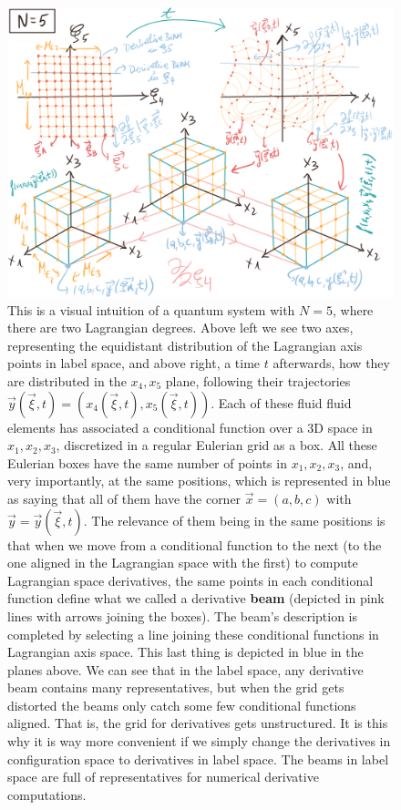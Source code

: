 \documentclass[11pt, a4paper]{article} %
\begin{document}
\begin{figure}[p!]
  \centering
    \includegraphics[width=1\linewidth]{12_N6.png}
  \caption{This is a visual intuition of a quantum system with $N=5$, where there are two Lagrangian degrees. Above left we see two axes, representing the equidistant distribution of the Lagrangian axis points in label space, and above right, a time $t$ afterwards, how they are distributed in the $x_4,x_5$ plane, following their trajectories $\vec{y}(\vec{\xi},t)=(x_4(\vec{\xi},t),x_5(\vec{\xi},t))$. Each of these fluid fluid elements has associated a conditional function over a 3D space in $x_1,x_2,x_3$, discretized in a regular Eulerian grid as a box. All these Eulerian boxes have the same number of points in $x_1,x_2,x_3$, and, very importantly, at the same positions, which is represented in blue as saying that all of them have the corner $\vec{x}=(a,b,c)$ with $\vec{y}=\vec{y}(\vec{\xi},t)$. The relevance of them being in the same positions is that when we move from a conditional function to the next (to the one aligned in the Lagrangian space with the first) to compute Lagrangian space derivatives, the same points in each conditional function define what we called a derivative {\bf beam} (depicted in pink lines with arrows joining the boxes). The beam's description is completed by selecting a line joining these conditional functions in Lagrangian axis space. This last thing is depicted in blue in the planes above. We can see that in the label space, any derivative beam contains many representatives, but when the grid gets distorted the beams only catch some few conditional functions aligned. That is, the grid for derivatives gets unstructured. It is this why it is way more convenient if we simply change the derivatives in configuration space to derivatives in label space. The beams in label space are full of representatives for numerical derivative computations.  }
  \label{fig:hyperplane2}
\end{figure}
\end{document}
